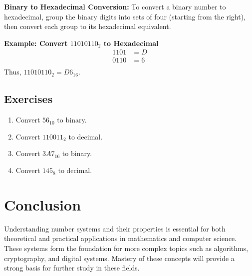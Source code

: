 \documentclass{article}
\begin{document}
\textbf{Binary to Hexadecimal Conversion:}
To convert a binary number to hexadecimal, group the binary digits into sets of four (starting from the right), then convert each group to its hexadecimal equivalent.

\textbf{Example: Convert \(11010110_2\) to Hexadecimal}
\[
\begin{aligned}
1101 & = D \\
0110 & = 6 \\
\end{aligned}
\]
Thus, \(11010110_2 = D6_{16}\).

\subsection{Exercises}
\begin{enumerate}
    \item Convert \(56_{10}\) to binary.
    \item Convert \(110011_2\) to decimal.
    \item Convert \(3A7_{16}\) to binary.
    \item Convert \(145_{8}\) to decimal.
\end{enumerate}

\section{Conclusion}
Understanding number systems and their properties is essential for both theoretical and practical applications in mathematics and computer science. These systems form the foundation for more complex topics such as algorithms, cryptography, and digital systems. Mastery of these concepts will provide a strong basis for further study in these fields.
\end{document}

